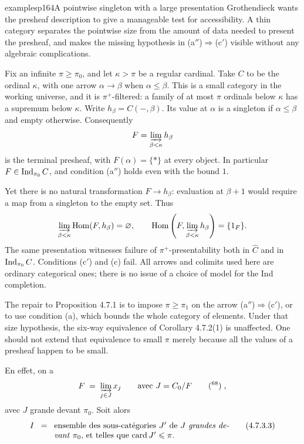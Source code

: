 \begin{dcomment}{examples}{p164}{A pointwise singleton with a large presentation}
Grothendieck wants the presheaf description to give a manageable test for accessibility. A thin category separates the pointwise size from the amount of data needed to present the presheaf, and makes the missing hypothesis in (a$''$)$\Rightarrow$(c$'$) visible without any algebraic complications.

Fix an infinite $\pi\geq\pi_0$, and let $\kappa>\pi$ be a regular cardinal. Take $C$ to be the ordinal $\kappa$, with one arrow $\alpha\to\beta$ when $\alpha\leq\beta$. This is a small category in the working universe, and it is $\pi^+$-filtered: a family of at most $\pi$ ordinals below $\kappa$ has a supremum below $\kappa$. Write $h_\beta=C(-,\beta)$. Its value at $\alpha$ is a singleton if $\alpha\leq\beta$ and empty otherwise. Consequently
\[
 F=\varinjlim_{\beta<\kappa}h_\beta
\]
is the terminal presheaf, with $F(\alpha)=\{*\}$ at every object. In particular $F\in\operatorname{Ind}_{\pi_0}C$, and condition (a$''$) holds even with the bound $1$.

Yet there is no natural transformation $F\to h_\beta$: evaluation at $\beta+1$ would require a map from a singleton to the empty set. Thus
\[
 \varinjlim_{\beta<\kappa}\operatorname{Hom}(F,h_\beta)=\varnothing,
 \qquad
 \operatorname{Hom}\left(F,\varinjlim_{\beta<\kappa}h_\beta\right)=\{1_F\}.
\]
The same presentation witnesses failure of $\pi^+$-presentability both in $\widehat C$ and in $\operatorname{Ind}_{\pi_0}C$. Conditions (c$'$) and (c) fail. All arrows and colimits used here are ordinary categorical ones; there is no issue of a choice of model for the Ind completion.

The repair to Proposition 4.7.1 is to impose $\pi\geq\pi_1$ on the arrow (a$''$)$\Rightarrow$(c$'$), or to use condition (a), which bounds the whole category of elements. Under that size hypothesis, the six-way equivalence of Corollary 4.7.2(1) is unaffected. One should not extend that equivalence to small $\pi$ merely because all the values of a presheaf happen to be small.
\end{dcomment}


En effet, on a
\[
F \;=\; \varinjlim_{j \in J} x_j \qquad \text{avec } J = C_0/F \qquad \text{(\footnotemark[68])}\;,
\]
avec $J$ grande devant $\pi_0$. Soit alors
\[
I \;\;=\;\; \parbox[t]{0.62\textwidth}{ensemble des sous-catégories $J'$ de $J$ \textit{grandes devant} $\pi_0$, et telles que $\card J' \leqslant \pi$.} \tag*{(4.7.3.3)}
\]

